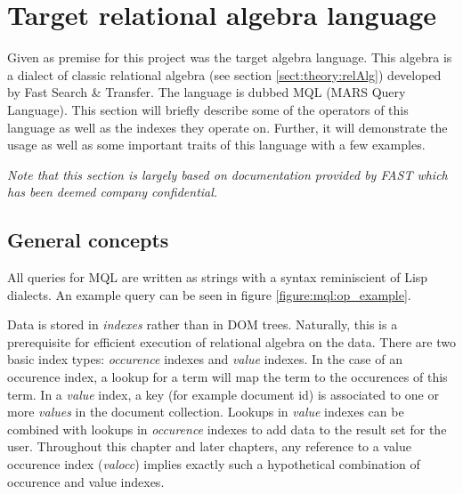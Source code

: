 \section{Target relational algebra language}
\label{sect:method:mql}
Given as premise for this project was the target algebra language. This
algebra is a dialect of classic relational algebra (see section
\ref{sect:theory:relAlg}) developed by Fast Search \& Transfer. The language
is dubbed MQL (MARS Query Language). This section will briefly describe some of the operators
of this language as well as the indexes they operate on. Further, it will demonstrate
the usage as well as some important traits of this language with a few
examples.

\emph{Note that this section is largely based on documentation provided by FAST which
has been deemed company confidential. }

\subsection{General concepts}
\label{sect:method:mql:indexes}
\label{sect:method:mql:concepts}
All queries for MQL are written as strings with a syntax reminiscient of Lisp
dialects. An example query can be seen in figure \ref{figure:mql:op_example}.

Data is stored in \textit{indexes} rather than in DOM trees. Naturally, this is a prerequisite for efficient
execution of relational algebra on the data. There are two basic index types: \textit{occurence} indexes and
\textit{value} indexes. In the case of an occurence index, a lookup for a term will map the term to the occurences
of this term. In a \textit{value} index, a key (for example document id) is associated to one or more
\textit{values} in the document collection. Lookups in \textit{value} indexes can be combined with lookups in
\textit{occurence} indexes to add data to the result set for the user.
Throughout this chapter and later chapters, any reference to a value occurence index (\textit{valocc})
implies exactly such a hypothetical combination of occurence and value indexes.

